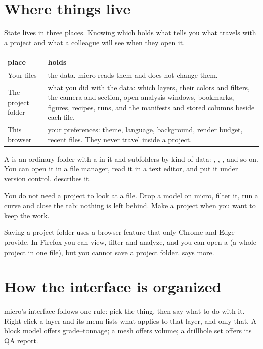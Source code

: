 \section{Where things live}\label{sec:micro-where}
State lives in three places. Knowing which holds what tells you what travels with a project and what a colleague will see when they open it.

\begin{tabularx}{\linewidth}{@{}lL@{}}\toprule
place & holds \\ \midrule
Your files & the data. micro reads them and does not change them. \\
The project folder & what you did with the data: which layers, their colors and filters, the camera and section, open analysis windows, bookmarks, figures, recipes, runs, and the manifests and stored columns beside each file. \\
This browser & your preferences: theme, language, background, render budget, recent files. They never travel inside a project. \\
\bottomrule
\end{tabularx}

A  is an ordinary folder with a  in it and subfolders by kind of data: , , ,  and so on. You can open it in a file manager, read it in a text editor, and put it under version control.  describes it.

You do not need a project to look at a file. Drop a model on micro, filter it, run a curve and close the tab: nothing is left behind. Make a project when you want to keep the work.

\begin{caution}
Saving a project folder uses a browser feature that only Chrome and Edge provide. In Firefox you can view, filter and analyze, and you can open a  (a whole project in one file), but you cannot save a project folder.  says more.
\end{caution}

\section{How the interface is organized}\label{sec:micro-interface}
micro's interface follows one rule: pick the thing, then say what to do with it. Right-click a layer and its menu lists what applies to that layer, and only that. A block model offers grade–tonnage; a mesh offers volume; a drillhole set offers its QA report.

